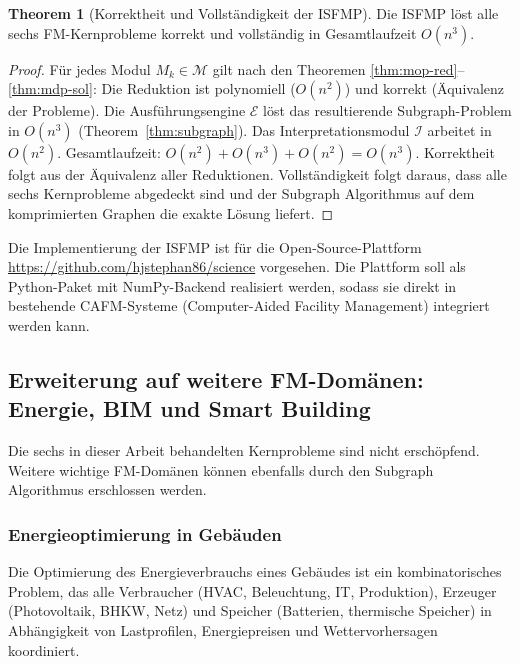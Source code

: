 ﻿\documentclass[a4paper,12pt]{article}
\theoremstyle{definition}
\newtheorem{theorem}{Theorem}[section]
\begin{document}
\begin{theorem}[Korrektheit und Vollständigkeit der ISFMP]
\label{thm:isfmp}
Die ISFMP löst alle sechs FM-Kernprobleme korrekt und vollständig in
Gesamtlaufzeit $O(n^3)$.
\end{theorem}

\begin{proof}
Für jedes Modul $M_k \in \mathcal{M}$ gilt nach den Theoremen
\ref{thm:mop-red}--\ref{thm:mdp-sol}: Die Reduktion ist polynomiell ($O(n^2)$)
und korrekt (Äquivalenz der Probleme). Die Ausführungsengine $\mathcal{E}$ löst
das resultierende Subgraph-Problem in $O(n^3)$ (Theorem~\ref{thm:subgraph}).
Das Interpretationsmodul $\mathcal{I}$ arbeitet in $O(n^2)$.
Gesamtlaufzeit: $O(n^2) + O(n^3) + O(n^2) = O(n^3)$.
Korrektheit folgt aus der Äquivalenz aller Reduktionen.
Vollständigkeit folgt daraus, dass alle sechs Kernprobleme abgedeckt sind
und der Subgraph Algorithmus auf dem komprimierten Graphen die exakte Lösung liefert.
\end{proof}

Die Implementierung der ISFMP ist für die Open-Source-Plattform
\url{https://github.com/hjstephan86/science} vorgesehen.
Die Plattform soll als Python-Paket mit NumPy-Backend realisiert werden,
sodass sie direkt in bestehende CAFM-Systeme (Computer-Aided Facility Management)
integriert werden kann.

\subsection{Erweiterung auf weitere FM-Domänen: Energie, BIM und Smart Building}

Die sechs in dieser Arbeit behandelten Kernprobleme sind nicht erschöpfend.
Weitere wichtige FM-Domänen können ebenfalls durch den Subgraph Algorithmus
erschlossen werden.

\subsubsection{Energieoptimierung in Gebäuden}

Die Optimierung des Energieverbrauchs eines Gebäudes ist ein kombinatorisches
Problem, das alle Verbraucher (HVAC, Beleuchtung, IT, Produktion), Erzeuger
(Photovoltaik, BHKW, Netz) und Speicher (Batterien, thermische Speicher)
in Abhängigkeit von Lastprofilen, Energiepreisen und Wettervorhersagen
koordiniert.
\end{document}
